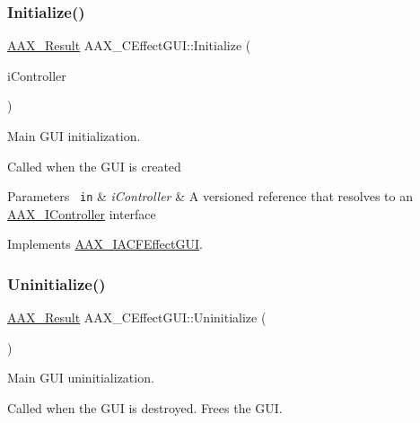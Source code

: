 \subsubsection{\texorpdfstring{Initialize()}{Initialize()}}
{\footnotesize\ttfamily \mbox{\hyperlink{a00392_a4d8f69a697df7f70c3a8e9b8ee130d2f}{A\+A\+X\+\_\+\+Result}} A\+A\+X\+\_\+\+C\+Effect\+G\+U\+I\+::\+Initialize (\begin{DoxyParamCaption}\item[{\mbox{\hyperlink{a01409}{I\+A\+C\+F\+Unknown}} $\ast$}]{i\+Controller }\end{DoxyParamCaption})\hspace{0.3cm}{\ttfamily [virtual]}}



Main G\+UI initialization. 

Called when the G\+UI is created


\begin{DoxyParams}[1]{Parameters}
\mbox{\texttt{ in}}  & {\em i\+Controller} & A versioned reference that resolves to an \mbox{\hyperlink{a01789}{A\+A\+X\+\_\+\+I\+Controller}} interface \\
\hline
\end{DoxyParams}


Implements \mbox{\hyperlink{a01665_aac9d8ab88172ac594d86ac2441522fec}{A\+A\+X\+\_\+\+I\+A\+C\+F\+Effect\+G\+UI}}.

\mbox{\label{a01477_a7d3230457433a1a8204114e57fef7bef}} 
\subsubsection{\texorpdfstring{Uninitialize()}{Uninitialize()}}
{\footnotesize\ttfamily \mbox{\hyperlink{a00392_a4d8f69a697df7f70c3a8e9b8ee130d2f}{A\+A\+X\+\_\+\+Result}} A\+A\+X\+\_\+\+C\+Effect\+G\+U\+I\+::\+Uninitialize (\begin{DoxyParamCaption}\item[{void}]{ }\end{DoxyParamCaption})\hspace{0.3cm}{\ttfamily [virtual]}}



Main G\+UI uninitialization. 

Called when the G\+UI is destroyed. Frees the G\+UI. 

